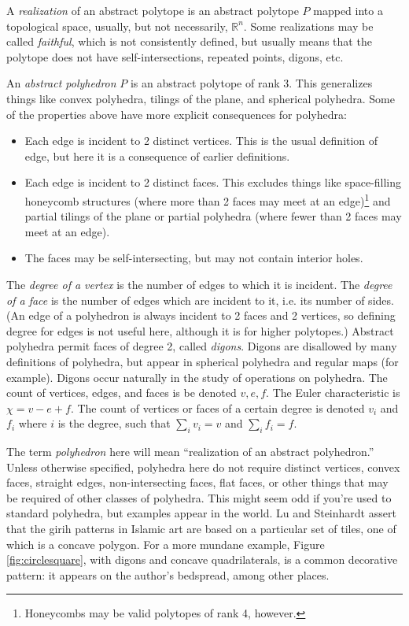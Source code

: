\documentclass{amsart}[12pt]
\begin{document}
A \textit{realization} of an abstract polytope is an abstract polytope $P$
mapped into a topological space, usually, but not necessarily, $\mathbb{R}^n$.
Some realizations may be called \textit{faithful}, which is not consistently
defined, but usually means that the polytope does not have self-intersections,
repeated points, digons, etc.

An \textit{abstract polyhedron} $P$ is an abstract polytope of rank 3. This
generalizes things like convex polyhedra, tilings of the plane,
and spherical polyhedra. Some of the properties above have more
explicit consequences for polyhedra: \cite{grunbaum03}
\begin{itemize}
  \item Each edge is incident to 2 distinct vertices. This is the usual
  definition of edge, but here it is a consequence of earlier definitions.
  \item Each edge is incident to 2 distinct faces. This excludes things like
  space-filling honeycomb structures (where more than 2 faces may meet at an
  edge)\footnote{Honeycombs may be valid polytopes of rank 4, however.} and
  partial tilings of the plane or partial polyhedra (where fewer than 2 faces may meet at an edge).
  \item The faces may be self-intersecting, but may not contain interior holes.
\end{itemize}
The \textit{degree of a vertex} is the number of edges to which it is incident.
The \textit{degree of a face} is the number of edges which are incident to it,
i.e. its number of sides. (An edge of a polyhedron is always incident to 2
faces and 2 vertices, so defining degree for edges is not useful here, although
it is for higher polytopes.)
Abstract polyhedra permit faces of degree 2, called \textit{digons}. Digons are
disallowed by many definitions of polyhedra, but appear in spherical polyhedra
and regular maps (for example). Digons occur naturally in the study of
operations on polyhedra. The count of vertices, edges, and faces is be denoted
$v, e, f$. The Euler characteristic is $\chi = v - e + f$. The count of
vertices or faces of a certain degree is denoted $v_i$ and $f_i$ where $i$ is
the degree, such that $\sum_i v_i = v$ and $\sum_i f_i = f$.

The term \textit{polyhedron} here will mean ``realization of an abstract
polyhedron.'' Unless otherwise specified, polyhedra here do not require
distinct vertices, convex faces, straight edges, non-intersecting faces, flat
faces, or other things that may be required of other classes of polyhedra. This
might seem odd if you're used to standard polyhedra, but examples appear in the
world. Lu and Steinhardt \cite{lu07} assert that the girih patterns in Islamic
art are based on a particular set of tiles, one of which is a concave polygon.
For a more mundane example, Figure \ref{fig:circlesquare}, with digons and
concave quadrilaterals, is a common decorative pattern: it appears on the
author's bedspread, among other places.
\end{document}
